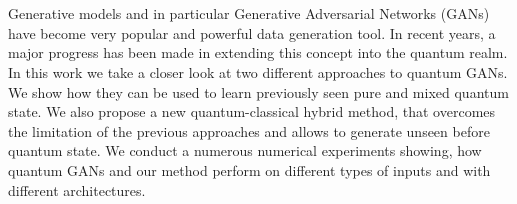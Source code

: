 \chapter{\abstractname}

Generative models and in particular Generative Adversarial Networks (GANs) have
become very popular and powerful data generation tool. In recent years, a major
progress has been made in extending this concept into the quantum realm. In this
work we take a closer look at two different approaches to quantum GANs. We show how they can
be used to learn previously seen pure and mixed quantum state. We also propose a
new quantum-classical hybrid method, that overcomes the limitation of
the previous approaches and allows to generate unseen before quantum state. We
conduct a numerous numerical experiments showing, how quantum 
GANs and our method perform on different types of inputs and with different
architectures. 






%
%
%
%
%
